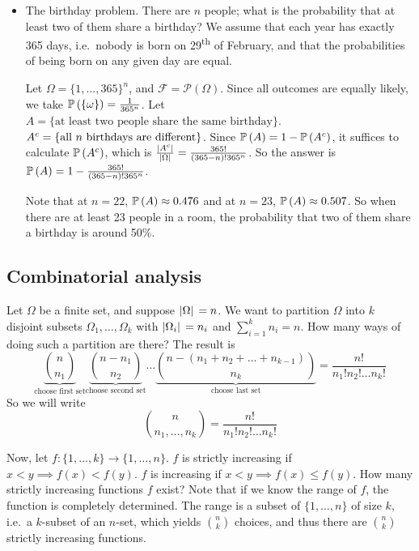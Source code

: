 \begin{example}
\begin{itemize}
	\item The birthday problem.
	      There are \(n\) people; what is the probability that at least two of them share a birthday?
	      We assume that each year has exactly 365 days, i.e.\ nobody is born on 29\textsuperscript{th} of February, and that the probabilities of being born on any given day are equal.

	      Let \(\Omega = \{1, \dots, 365\}^n\), and \(\mathcal F = \mathcal P(\Omega)\).
	      Since all outcomes are equally likely, we take \(\mathbb{P}\left({\{\omega\}}\right) = \frac{1}{365^n}\).
	      Let \(A = \{ \text{at least two people share the same birthday} \}\).
	      \({A}^c = \{ \text{all } n \text{ birthdays are different} \}\).
	      Since \(\mathbb{P}\left({A}\right) = 1 - \mathbb{P}\left({{A}^c}\right)\), it suffices to calculate \(\mathbb{P}\left({{A}^c}\right)\), which is \(\frac{\abs*{{A}^c}}{\abs*{\Omega}} = \frac{365!}{(365 - n)!365^n}\).
	      So the answer is \(\mathbb{P}\left({A}\right) = 1 - \frac{365!}{(365 - n)!365^n}\).

	      Note that at \(n=22\), \(\mathbb{P}\left({A}\right) \approx 0.476\) and at \(n=23\), \(\mathbb{P}\left({A}\right) \approx 0.507\).
	      So when there are at least 23 people in a room, the probability that two of them share a birthday is around 50\%.
\end{itemize}
\end{example}

\subsection{Combinatorial analysis}
Let \(\Omega\) be a finite set, and suppose \(\abs*{\Omega} = n\).
We want to partition \(\Omega\) into \(k\) disjoint subsets \(\Omega_1, \dots, \Omega_k\) with \(\abs*{\Omega_i} = n_i\) and \(\sum_{i=1}^k n_i = n\).
How many ways of doing such a partition are there?
The result is
\[
	\underbrace{\binom{n}{n_1}}_{\text{choose first set}}\underbrace{\binom{n-n_1}{n_2}}_{\text{choose second set}}\dots\underbrace{\binom{n-(n_1 + n_2 + \dots + n_{k-1})}{n_k}}_{\text{choose last set}} = \frac{n!}{n_1!n_2!\dots n_k!}
\]
So we will write
\[
	\binom{n}{n_1, \dots, n_k} = \frac{n!}{n_1!n_2!\dots n_k!}
\]

Now, let \(f\colon \{1, \dots, k\} \to \{1, \dots, n\}\).
\(f\) is strictly increasing if \(x < y \implies f(x) < f(y)\).
\(f\) is increasing if \(x < y \implies f(x) \leq f(y)\).
How many strictly increasing functions \(f\) exist?
Note that if we know the range of \(f\), the function is completely determined.
The range is a subset of \(\{1, \dots, n\}\) of size \(k\), i.e.\ a \(k\)-subset of an \(n\)-set, which yields \(\binom{n}{k}\) choices, and thus there are \(\binom{n}{k}\) strictly increasing functions.

